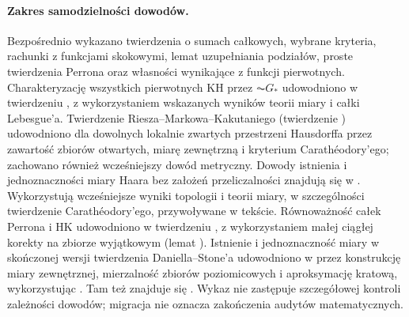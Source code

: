\paragraph*{Zakres samodzielności dowodów.}
Bezpośrednio wykazano twierdzenia o sumach całkowych, wybrane kryteria, rachunki z funkcjami skokowymi, lemat uzupełniania podziałów, proste twierdzenia Perrona oraz własności wynikające z funkcji pierwotnych. Charakteryzację wszystkich pierwotnych KH przez $\AC G_*$ udowodniono w twierdzeniu , z wykorzystaniem wskazanych wyników teorii miary i całki Lebesgue'a. Twierdzenie Riesza--Markowa--Kakutaniego (twierdzenie ) udowodniono dla dowolnych lokalnie zwartych przestrzeni Hausdorffa przez zawartość zbiorów otwartych, miarę zewnętrzną i kryterium Carathéodory'ego; zachowano również wcześniejszy dowód metryczny. Dowody istnienia i jednoznaczności miary Haara bez założeń przeliczalności znajdują się w . Wykorzystują wcześniejsze wyniki topologii i teorii miary, w szczególności twierdzenie Carathéodory'ego, przywoływane w tekście. Równoważność całek Perrona i HK udowodniono w twierdzeniu , z wykorzystaniem małej ciągłej korekty na zbiorze wyjątkowym (lemat ). Istnienie i jednoznaczność miary w skończonej wersji twierdzenia Daniella--Stone'a udowodniono w  przez konstrukcję miary zewnętrznej, mierzalność zbiorów poziomicowych i aproksymację kratową, wykorzystując . Tam też znajduje się . Wykaz nie zastępuje szczegółowej kontroli zależności dowodów; migracja nie oznacza zakończenia audytów matematycznych.

